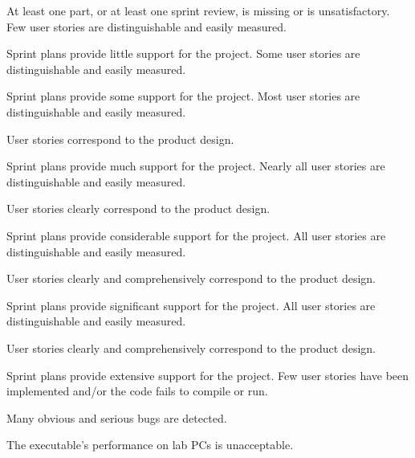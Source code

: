 \documentclass{../fal_assignment}
\begin{document}
\rubricyeartwo
\begin{markingrubric}
		\grade\fail At least one part, or at least one sprint review, is missing or is unsatisfactory.
%
        \grade \fail Few user stories are distinguishable and easily measured.
            \par Sprint plans provide little support for the project.
        \grade Some user stories are distinguishable and easily measured.
            \par Sprint plans provide some support for the project.
        \grade Most user stories are distinguishable and easily measured.
            \par User stories correspond to the product design.
            \par Sprint plans provide much support for the project.
        \grade Nearly all user stories are distinguishable and easily measured.
            \par User stories clearly correspond to the product design.
            \par Sprint plans provide considerable support for the project.
        \grade All user stories are distinguishable and easily measured.
            \par User stories clearly and comprehensively correspond to the product design.
            \par Sprint plans provide significant support for the project.
        \grade All user stories are distinguishable and easily measured.
            \par User stories clearly and comprehensively correspond to the product design.
            \par Sprint plans provide extensive support for the project.
%
        \grade \fail Few user stories have been implemented  and/or the code fails to compile or run.
            \par Many obvious and serious bugs are detected.
            \par The executable's performance on lab PCs is unacceptable.

\end{markingrubric}
\end{document}
